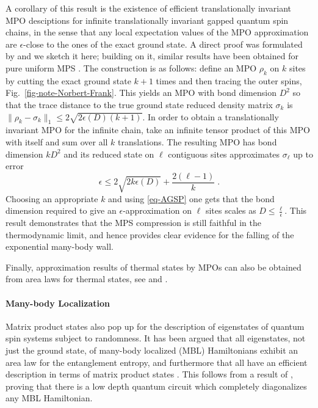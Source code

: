 \documentclass[rmp,aps,reprint,superscriptaddress,nobalancelastpage]{revtex4-1}
\begin{document}
A corollary of this  result is the existence of efficient translationally invariant MPO desciptions for infinite translationally invariant gapped quantum spin chains, in the sense that any local expectation values  of the MPO approximation are $\epsilon$-close to the ones of the exact ground state. A direct proof was formulated by \citet{schuch2017matrix} and we sketch it here; building on it, similar results have been obtained for pure uniform MPS \cite{dalzell:local-MPS-approx,huang2019matrix}. The construction is as follows: define an MPO $\rho_k$ on $k$ sites by cutting the exact ground state $k+1$ times and then tracing the outer spins, Fig.~\ref{fig-note-Norbert-Frank}. This yields an MPO with bond dimension $D^2$ so that the trace distance to the true ground state reduced density matrix $\sigma_k$ is $\|\rho_k-\sigma_k\|_1\le 2\sqrt{2\epsilon(D)(k+1)}$.
In order to obtain a translationally invariant MPO for the infinite chain, take an infinite tensor product of this MPO with itself  and sum over all $k$ translations. The resulting MPO has bond dimension $k D^2$ and its reduced state on $\ell$ contiguous sites approximates  $\sigma_\ell$ up to error
$$\epsilon\le 2\sqrt{2k\epsilon(D)} + \frac{2(\ell-1)}{k}\;.$$
Choosing an appropriate $k$ and using \eqref{eq-AGSP} one gets that the bond dimension required to give an $\epsilon$-approximation on $\ell$ sites scales as $D\leq\frac{\ell}{\epsilon}$.  This result demonstrates that the MPS compression is still faithful in the thermodynamic limit, and hence provides clear evidence for the falling of the exponential many-body wall.

Finally, approximation results of thermal states by MPOs can also be obtained from area laws for thermal states, see \citet{kuwahara:thermal-area-law} and \citet{jarkovsky:mpdo-arealaw}.



\paragraph{Many-body Localization}

Matrix product states also pop up for the description of eigenstates of quantum spin systems subject to randomness. It has been argued that all eigenstates, not just the ground state, of many-body localized (MBL) Hamiltonians exhibit an area law for the entanglement entropy, and furthermore that all have an efficient description in terms of matrix product states \cite{bauer2013area,nandkishore2015many,wahl2017efficient}. This follows from a result of \citet{imbrie2016many}, proving that there is a low depth quantum circuit which completely diagonalizes any MBL Hamiltonian.
\end{document}
